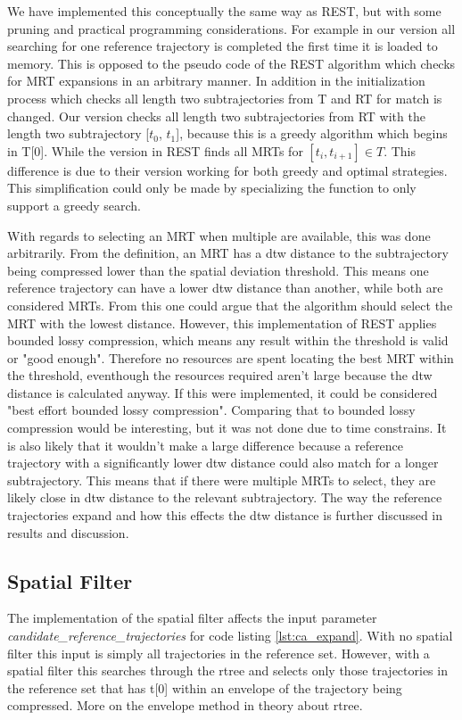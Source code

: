 We have implemented this conceptually the same way as REST, but with some pruning and practical programming considerations. For example in our version all searching for one reference trajectory is completed the first time it is loaded to memory. This is opposed to the pseudo code of the REST algorithm which checks for MRT expansions in an arbitrary manner. In addition in the initialization process which checks all length two subtrajectories from T and RT for match is changed. Our version checks all length two subtrajectories from RT with the length two subtrajectory [$t_0$, $t_1$], because this is a greedy algorithm which begins in T[0]. While the version in REST finds all MRTs for $[t_i, t_{i+1}] \in T$. This difference is due to their version working for both greedy and optimal strategies. This simplification could only be made by specializing the function to only support a greedy search.

With regards to selecting an MRT when multiple are available, this was done arbitrarily. From the definition, an MRT has a dtw distance to the subtrajectory being compressed lower than the spatial deviation threshold. This means one reference trajectory can have a lower dtw distance than another, while both are considered MRTs. From this one could argue that the algorithm should select the MRT with the lowest distance. However, this implementation of REST applies bounded lossy compression, which means any result within the threshold is valid or "good enough". Therefore no resources are spent locating the best MRT within the threshold, eventhough the resources required aren't large because the dtw distance is calculated anyway. If this were implemented, it could be considered "best effort bounded lossy compression". Comparing that to bounded lossy compression would be interesting, but it was not done due to time constrains. It is also likely that it wouldn't make a large difference because a reference trajectory with a significantly lower dtw distance could also match for a longer subtrajectory. This means that if there were multiple MRTs to select, they are likely close in dtw distance to the relevant subtrajectory. The way the reference trajectories expand and how this effects the dtw distance is further discussed in results and discussion. %

\subsection{Spatial Filter}
The implementation of the spatial filter affects the input parameter \break \textit{candidate\_reference\_trajectories} for code listing \ref{lst:ca_expand}. With no spatial filter this input is simply all trajectories in the reference set. However, with a spatial filter this searches through the rtree and selects only those trajectories in the reference set that has t[0] within an envelope of the trajectory being compressed. More on the envelope method in theory about rtree.

